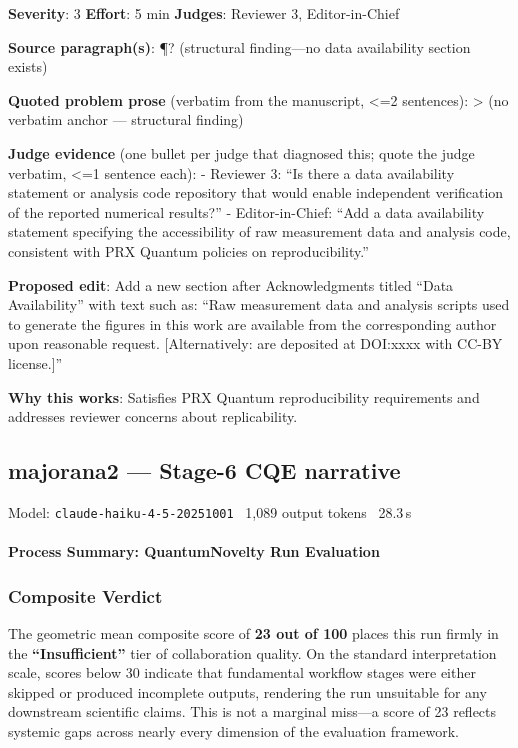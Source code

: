 \documentclass[10pt,letterpaper]{article}
\begin{document}
\textbf{Severity}: 3 \textbf{Effort}: 5 min \textbf{Judges}: Reviewer 3, Editor-in-Chief

\textbf{Source paragraph(s)}: ¶? (structural finding---no data availability section exists)

\textbf{Quoted problem prose} (verbatim from the manuscript, \textless=2 sentences):
\textgreater{} (no verbatim anchor --- structural finding)

\textbf{Judge evidence} (one bullet per judge that diagnosed this; quote the judge verbatim, \textless=1 sentence each):
- Reviewer 3: ``Is there a data availability statement or analysis code repository that would enable independent verification of the reported numerical results?''
- Editor-in-Chief: ``Add a data availability statement specifying the accessibility of raw measurement data and analysis code, consistent with PRX Quantum policies on reproducibility.''

\textbf{Proposed edit}: Add a new section after Acknowledgments titled ``Data Availability'' with text such as: ``Raw measurement data and analysis scripts used to generate the figures in this work are available from the corresponding author upon reasonable request. {[}Alternatively: are deposited at DOI:xxxx with CC-BY license.{]}''

\textbf{Why this works}: Satisfies PRX Quantum reproducibility requirements and addresses reviewer concerns about replicability.


\subsection{majorana2 --- Stage-6 CQE narrative}
\noindent\textcolor{muted}{\small Model: \texttt{claude-haiku-4-5-20251001} \textperiodcentered\ 1,089 output tokens \textperiodcentered\ 28.3\,s}

\hypertarget{process-summary-quantumnovelty-run-evaluation}{%
\paragraph{Process Summary: QuantumNovelty Run Evaluation}\label{process-summary-quantumnovelty-run-evaluation}}

\hypertarget{composite-verdict}{%
\subsubsection{Composite Verdict}\label{composite-verdict}}

The geometric mean composite score of \textbf{23 out of 100} places this run firmly in the \textbf{``Insufficient''} tier of collaboration quality. On the standard interpretation scale, scores below 30 indicate that fundamental workflow stages were either skipped or produced incomplete outputs, rendering the run unsuitable for any downstream scientific claims. This is not a marginal miss---a score of 23 reflects systemic gaps across nearly every dimension of the evaluation framework.
\end{document}
